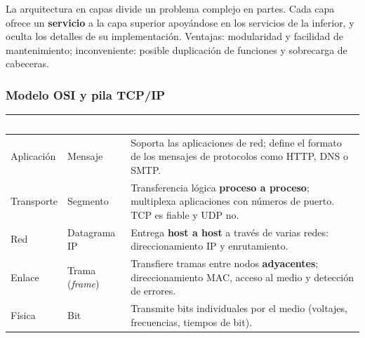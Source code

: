 \documentclass[11pt,a4paper]{article}
\newcommand{\hd}[1]{\cellcolor{uahblue}\textcolor{white}{\textbf{#1}}}
\begin{document}
La arquitectura en capas divide un problema complejo en partes. Cada capa ofrece un \textbf{servicio} a la capa superior apoyándose en los servicios de la inferior, y oculta los detalles de su implementación. Ventajas: modularidad y facilidad de mantenimiento; inconveniente: posible duplicación de funciones y sobrecarga de cabeceras.

\subsubsection{Modelo OSI y pila TCP/IP}

\begin{center}
\end{center}

\begin{tabularx}{\textwidth}{@{}L{2.8cm}L{3.2cm}X@{}}
\toprule
\hd{Capa} & \hd{PDU} & \hd{Función} \\
\midrule
Aplicación & Mensaje & Soporta las aplicaciones de red; define el formato de los mensajes de protocolos como HTTP, DNS o SMTP. \\
Transporte & Segmento & Transferencia lógica \textbf{proceso a proceso}; multiplexa aplicaciones con números de puerto. TCP es fiable y UDP no. \\
Red & Datagrama IP & Entrega \textbf{host a host} a través de varias redes: direccionamiento IP y enrutamiento. \\
Enlace & Trama (\emph{frame}) & Transfiere tramas entre nodos \textbf{adyacentes}; direccionamiento MAC, acceso al medio y detección de errores. \\
Física & Bit & Transmite bits individuales por el medio (voltajes, frecuencias, tiempos de bit). \\
\bottomrule
\end{tabularx}
\end{document}
